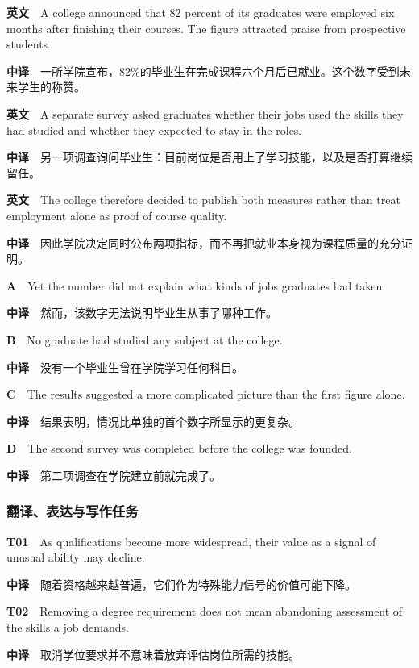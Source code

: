 \documentclass[
  11pt,
]{ctexart}
\begin{document}
\textbf{英文}　A college announced that 82 percent of its graduates were
employed six months after finishing their courses. The figure attracted
praise from prospective students.

\textbf{中译}　一所学院宣布，82\%的毕业生在完成课程六个月后已就业。这个数字受到未来学生的称赞。

\textbf{英文}　A separate survey asked graduates whether their jobs used
the skills they had studied and whether they expected to stay in the
roles.

\textbf{中译}　另一项调查询问毕业生：目前岗位是否用上了学习技能，以及是否打算继续留任。

\textbf{英文}　The college therefore decided to publish both measures
rather than treat employment alone as proof of course quality.

\textbf{中译}　因此学院决定同时公布两项指标，而不再把就业本身视为课程质量的充分证明。

\textbf{A}　Yet the number did not explain what kinds of jobs graduates
had taken.

\textbf{中译}　然而，该数字无法说明毕业生从事了哪种工作。

\textbf{B}　No graduate had studied any subject at the college.

\textbf{中译}　没有一个毕业生曾在学院学习任何科目。

\textbf{C}　The results suggested a more complicated picture than the
first figure alone.

\textbf{中译}　结果表明，情况比单独的首个数字所显示的更复杂。

\textbf{D}　The second survey was completed before the college was
founded.

\textbf{中译}　第二项调查在学院建立前就完成了。

\subsubsection{翻译、表达与写作任务}\label{ux7ffbux8bd1ux8868ux8fbeux4e0eux5199ux4f5cux4efbux52a1}

\textbf{T01}　As qualifications become more widespread, their value as a
signal of unusual ability may decline.

\textbf{中译}　随着资格越来越普遍，它们作为特殊能力信号的价值可能下降。

\textbf{T02}　Removing a degree requirement does not mean abandoning
assessment of the skills a job demands.

\textbf{中译}　取消学位要求并不意味着放弃评估岗位所需的技能。
\end{document}
